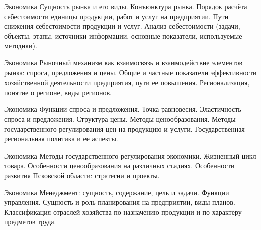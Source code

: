 \documentclass[
	11pt,
	a4paper,
	]
	{article}
\begin{document}
	

\begin{minipage}[t][\miniH]{\miniL}\centering
	 {Экономика}
		{
			Сущность рынка и его виды. Конъюнктура рынка.
		}{
			Порядок расчёта себестоимости единицы продукции, работ и услуг на предприятии. Пути снижения себестоимости продукции и услуг.
		}{
			Анализ себестоимости (задачи, объекты, этапы, источники информации, основные показатели, используемые методики).
		}
	\lowGE
\end{minipage}

\vfill



\begin{minipage}[t][\miniH]{\miniL}\centering
	 {Экономика}
		{
			Рыночный механизм как взаимосвязь и взаимодействие элементов рынка: спроса, предложения и цены.
		}{
			Общие и частные показатели эффективности хозяйственной деятельности предприятия, пути ее повышения.
		}{
			Регионализация, понятие о регионе, виды регионов.
		}
	\lowGE
\end{minipage}

\vfill



\begin{minipage}[t][\miniH]{\miniL}\centering
	 {Экономика}
		{
			Функции спроса и предложения. Точка равновесия. Эластичность спроса и предложения.
		}{
			Структура цены. Методы ценообразования. Методы государственного регулирования цен на продукцию и услуги.
		}{
			Государственная региональная политика и ее аспекты.
		}
	\lowGE
\end{minipage}





\begin{minipage}[t][\miniH]{\miniL}\centering
	 {Экономика}
		{
			Методы государственного регулирования экономики.
		}{
			Жизненный цикл товара. Особенности ценообразования на различных стадиях.
		}{
			Особенности развития Псковской области: стратегии и проекты.
		}
	\lowGE
\end{minipage}

\vfill



\begin{minipage}[t][\miniH]{\miniL}\centering
	 {Экономика}
		{
			Менеджмент: сущность, содержание, цель и задачи. Функции управления.
		}{
			Сущность и роль планирования на предприятии, виды планов.
		}{
			Классификация отраслей хозяйства по назначению продукции и по характеру предметов труда.
		}
	\lowGE
\end{minipage}
\end{document}
